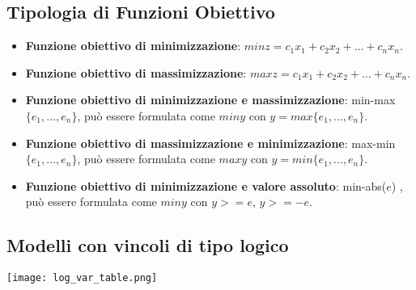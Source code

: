     \subsection{Tipologia di Funzioni Obiettivo}
        \begin{itemize}
            \item \textbf{Funzione obiettivo di minimizzazione}: $min z = c_1x_1 + c_2x_2 + \dots + c_nx_n$.
            \item \textbf{Funzione obiettivo di massimizzazione}: $max z = c_1x_1 + c_2x_2 + \dots + c_nx_n$.
            \item \textbf{Funzione obiettivo di minimizzazione e massimizzazione}: min-max $\{e_1,..., e_n\}$, può essere formulata come $min y$ con $y = max \{e_1,..., e_n\}$.
            \item \textbf{Funzione obiettivo di massimizzazione e minimizzazione}: max-min $\{e_1,..., e_n\}$, può essere formulata come $max y$ con $y = min \{e_1,..., e_n\}$.
            \item \textbf{Funzione obiettivo di minimizzazione e valore assoluto}: min-abs($e$) , può essere formulata come $min y$ con $y >= e$, $y >= -e$.
        \end{itemize}

    \subsection{Modelli con vincoli di tipo logico} 
        \begin{center}
            \texttt{[image: log\_var\_table.png]}
        \end{center}


